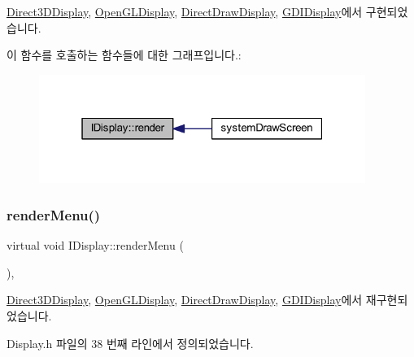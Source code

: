 \mbox{\hyperlink{class_direct3_d_display_a1c789bf663cfd32bb2827b9a0f0429c7}{Direct3\+D\+Display}}, \mbox{\hyperlink{class_open_g_l_display_aa0ae6cc7e0a15da37e167d6f91590c49}{Open\+G\+L\+Display}}, \mbox{\hyperlink{class_direct_draw_display_ab09489c28cb1fb5aaab0e51824fe3a28}{Direct\+Draw\+Display}}, \mbox{\hyperlink{class_g_d_i_display_a7c83b043ba5d2058b8419053615ffabc}{G\+D\+I\+Display}}에서 구현되었습니다.

이 함수를 호출하는 함수들에 대한 그래프입니다.\+:
\nopagebreak
\begin{figure}[H]
\begin{center}
\leavevmode
\includegraphics[width=301pt]{class_i_display_af61c440b97da313a502e86346a729b03_icgraph}
\end{center}
\end{figure}
\mbox{\label{class_i_display_ad6fc199a615635440ca01485c1283d41}} 
\subsubsection{\texorpdfstring{render\+Menu()}{renderMenu()}}
{\footnotesize\ttfamily virtual void I\+Display\+::render\+Menu (\begin{DoxyParamCaption}{ }\end{DoxyParamCaption})\hspace{0.3cm}{\ttfamily [inline]}, {\ttfamily [virtual]}}



\mbox{\hyperlink{class_direct3_d_display_a099bbef2eaaf90efb3ecb00c68103fe7}{Direct3\+D\+Display}}, \mbox{\hyperlink{class_open_g_l_display_a55b32d45baec33ca6f800e5d847cb8f4}{Open\+G\+L\+Display}}, \mbox{\hyperlink{class_direct_draw_display_a0a207e0d27c3ccf35d0b5b56fe78678e}{Direct\+Draw\+Display}}, \mbox{\hyperlink{class_g_d_i_display_a0d38608d640f217ded743d3c88dfe62a}{G\+D\+I\+Display}}에서 재구현되었습니다.



Display.\+h 파일의 38 번째 라인에서 정의되었습니다.


